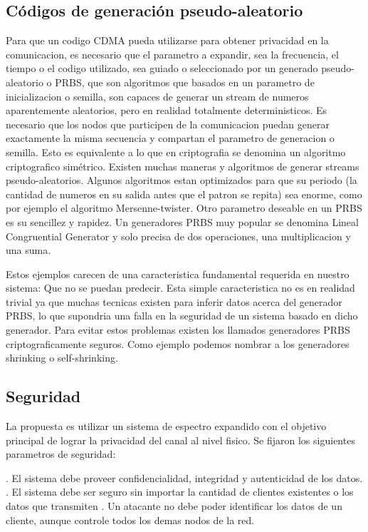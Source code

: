 \documentclass[12pt,twoside,openright]{moddalthesis}
\begin{document}
\subsection{Códigos de generación pseudo-aleatorio}
Para que un codigo CDMA pueda utilizarse para obtener privacidad en la comunicacion, es necesario que el parametro a expandir, sea la frecuencia, el tiempo o el codigo utilizado, sea guiado o seleccionado por un generado pseudo-aleatorio o PRBS, que son algoritmos que basados en un parametro de inicializacion o semilla, son capaces de generar un stream de numeros aparentemente aleatorios, pero en realidad totalmente deterministicos. 
Es necesario que los nodos que participen de la comunicacion puedan generar exactamente la misma secuencia y compartan el parametro de generacion o semilla. Esto es equivalente a lo que en criptografia se denomina un algoritmo criptografico simétrico.
Existen muchas maneras y algoritmos de generar streams pseudo-aleatorios. Algunos algoritmos estan optimizados para que su periodo (la cantidad de numeros en su salida antes que el patron se repita) sea enorme, como por ejemplo el algoritmo Mersenne-twister.
Otro parametro deseable en un PRBS es su sencillez y rapidez. Un generadores PRBS muy popular se denomina Lineal Congruential Generator y solo precisa de dos operaciones, una multiplicacion y una suma.

Estos ejemplos carecen de una caracteristica fundamental requerida en nuestro sistema: Que no se puedan predecir. Esta simple caracteristica no es en realidad trivial ya que muchas tecnicas existen para inferir datos acerca del generador PRBS, lo que supondria una falla en la seguridad de un sistema basado en dicho generador. Para evitar estos problemas existen los llamados generadores PRBS criptograficamente seguros. Como ejemplo podemos nombrar a los generadores shrinking o self-shrinking.

\subsection{Seguridad}
La propuesta es utilizar un sistema de espectro expandido con el objetivo principal de lograr la privacidad del canal al nivel fisico.
Se fijaron los siguientes parametros de seguridad:

. El sistema debe proveer confidencialidad, integridad y autenticidad de los datos.
. El sistema debe ser seguro sin importar la cantidad de clientes existentes o los datos que transmiten
. Un atacante no debe poder identificar los datos de un cliente, aunque controle todos los demas nodos de la red.
\end{document}
